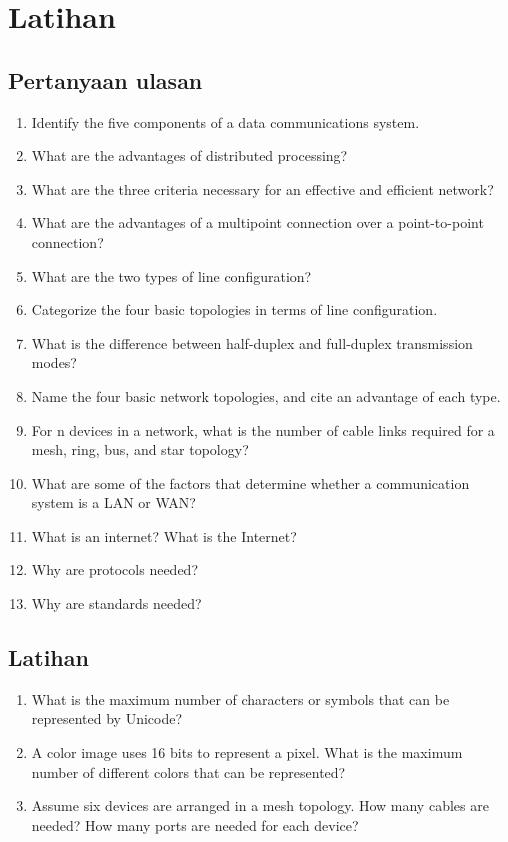 \section{Latihan}

\subsection*{Pertanyaan ulasan}

\begin{enumerate}
  \item Identify the five components of a data communications system. 
  \item What are the advantages of distributed processing? 
  \item What are the three criteria necessary for an effective and efficient network? 
  \item What are the advantages of a multipoint connection over a point-to-point connection? 
  \item What are the two types of line configuration? 
  \item Categorize the four basic topologies in terms of line configuration. 
  \item What is the difference between half-duplex and full-duplex transmission modes? 
  \item Name the four basic network topologies, and cite an advantage of each type. 
  \item For n devices in a network, what is the number of cable links required for a mesh, ring, bus, and star topology? 
  \item What are some of the factors that determine whether a communication system is a LAN or WAN?
  \item What is an internet? What is the Internet? 
  \item Why are protocols needed? 
  \item Why are standards needed?
\end{enumerate}

\subsection*{Latihan}
\begin{enumerate}[resume]
  \item What is the maximum number of characters or symbols that can be represented by Unicode? 
  \item A color image uses 16 bits to represent a pixel. What is the maximum number of different colors that can be represented? 
  \item Assume six devices are arranged in a mesh topology. How many cables are needed? How many ports are needed for each device?
\end{enumerate}